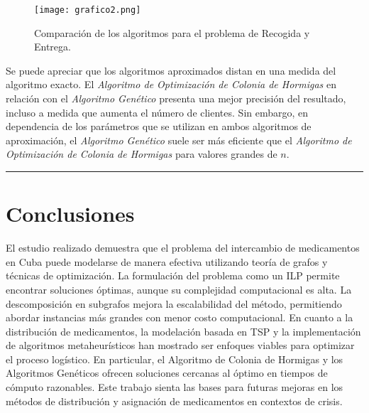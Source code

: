\documentclass[twocolumn, fontsize=10pt]{article}
\theoremstyle{definition} %
\begin{document}
\begin{figure}[h]
    \centering
    \texttt{[image: grafico2.png]}
    \caption{Comparación de los algoritmos para el problema de Recogida y Entrega.}
    \label{fig:gadget}
\end{figure}

Se puede apreciar que los algoritmos aproximados distan en una medida del algoritmo exacto. El \textit{Algoritmo de Optimización de Colonia de Hormigas} en relación con el \textit{Algoritmo Genético} presenta una mejor precisión del resultado, incluso a medida que aumenta el número de clientes. Sin embargo, en dependencia de los parámetros que se utilizan en ambos algoritmos de aproximación, el \textit{Algoritmo Genético} suele ser más eficiente que el \textit{Algoritmo de Optimización de Colonia de Hormigas} para valores grandes de \(n\). 

\rule{\linewidth}{0.5pt}

\section{Conclusiones}

El estudio realizado demuestra que el problema del intercambio de medicamentos en Cuba puede modelarse de manera efectiva utilizando teoría de grafos y técnicas de optimización. La formulación del problema como un ILP permite encontrar soluciones óptimas, aunque su complejidad computacional es alta. La descomposición en subgrafos mejora la escalabilidad del método, permitiendo abordar instancias más grandes con menor costo computacional. En cuanto a la distribución de medicamentos, la modelación basada en TSP y la implementación de algoritmos metaheurísticos han mostrado ser enfoques viables para optimizar el proceso logístico. En particular, el Algoritmo de Colonia de Hormigas y los Algoritmos Genéticos ofrecen soluciones cercanas al óptimo en tiempos de cómputo razonables. Este trabajo sienta las bases para futuras mejoras en los métodos de distribución y asignación de medicamentos en contextos de crisis.

\renewcommand\refname{Referencias}
\end{document}
